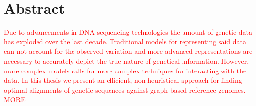 \documentclass[thesis.tex]{subfiles}
\begin{document}
\chapter*{Abstract}
\textcolor{red}{Due to advancements in DNA sequencing technologies the amount of genetic data has exploded over the last decade. Traditional models for representing said data can not account for the observed variation and more advanced representations are necessary to accurately depict the true nature of genetical information. However, more complex models calls for more complex techniques for interacting with the data. In this thesis we present an efficient, non-heuristical approach for finding optimal alignments of genetic sequences against graph-based reference genomes. MORE}
\end{document}
